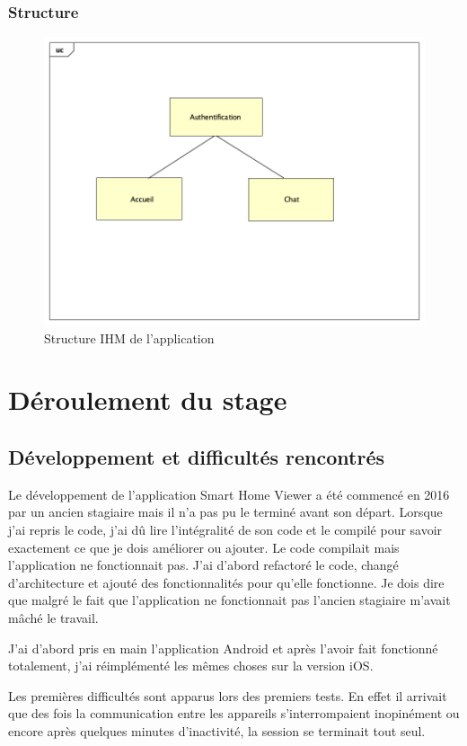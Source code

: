 \subsubsection*{Structure}
\begin{figure}[H]
	\centering
	\includegraphics[scale=0.4]{assets/images/ihm.png}
	\caption{Structure \gls{IHM} de l'application}
	\label{fig.8}
\end{figure}
\section{Déroulement du stage}
\subsection{Développement et difficultés rencontrés}
Le développement de l'application Smart Home Viewer a été commencé en 2016 par un ancien stagiaire mais il n'a pas pu le terminé avant son départ. Lorsque j'ai repris le code, j'ai dû lire l'intégralité de son code et le compilé pour savoir exactement ce que je dois améliorer ou ajouter. Le code compilait mais l'application ne fonctionnait pas. J'ai d'abord refactoré le code, changé d'architecture et ajouté des fonctionnalités pour qu'elle fonctionne. Je dois dire que malgré le fait que l'application ne fonctionnait pas l'ancien stagiaire m'avait mâché le travail.

J'ai d'abord pris en main l'application \gls{Android} et après l'avoir fait fonctionné totalement, j'ai réimplémenté les mêmes choses sur la version \gls{iOS}.

Les premières difficultés sont apparus lors des premiers tests. En effet il arrivait que des fois la communication entre les appareils s'interrompaient inopinément ou encore après quelques minutes d'inactivité, la session se terminait tout seul.

